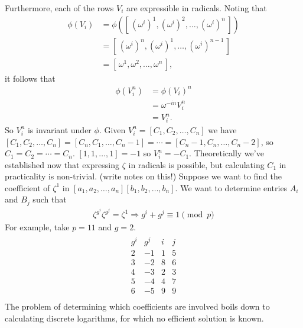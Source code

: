 \documentclass{article}
\renewcommand\({\left(}
\renewcommand\){\right)}
\begin{document}
\vspace{6mm}
Furthermore, each of the rows $V_i$ are expressible in radicals. Noting that
\begin{align*}
    \phi\left(V_i\right)&=\phi\left([\,(\omega^i)^1,(\omega^i)^2,\ldots,(\omega^i)^n\,]\right)\\
    &=[\,(\omega^i)^n,(\omega^i)^1,\ldots,(\omega^i)^{n-1}\,]\\
    &=[\,\omega^1,\omega^2,\ldots,\omega^n\,],
\end{align*}
it follows that
\begin{align*}
    \phi\left(V_i^n\right)&=\phi\left(V_i\right)^n \tag*{(automorphisms preserve products)}\\
    &=\omega^{-in}V_i^n\\
    &=V_i^n.
\end{align*}
So $V_i^n$ is invariant under $\phi$. Given $V_i^n=[C_1,C_2,\ldots,C_n]$ we have $[C_1,C_2,\ldots,C_n]=[C_n,C_1,\ldots,C_n-1]=\cdots=[C_n-1,C_n,\ldots,C_n-2]$, so $C_1=C_2=\cdots=C_n$. $[1,1,\dots,1]=-1$ so $V_i^n=-C_1$. Theoretically we've established now that expressing $\zeta$ in radicals is possible, but calculating $C_1$ in practicality is non-trivial. (write notes on this!) Suppose we want to find the coefficient of $\zeta^1$ in $[a_1,a_2,\dots,a_n][b_1,b_2,\dots,b_n]$. We want to determine entries $A_i$ and $B_j$ such that 
\begin{align*}
    \zeta^{g^i}\zeta^{g^j}=\zeta^1\Rightarrow g^i+g^j\equiv 1\pmod{p}
\end{align*}
For example, take $p=11$ and $g=2$.
\begin{align*}
    \begin{array}{c|c|c|c}
        g^i&g^j&i&j\\
        \hline
        2&-1&1&5\\
        3&-2&8&6\\
        4&-3&2&3\\
        5&-4&4&7\\
        6&-5&9&9\\
    \end{array}
\end{align*}
The problem of determining which coefficients are involved boils down to calculating discrete logarithms, for which no efficient solution is known. 
\end{document}
